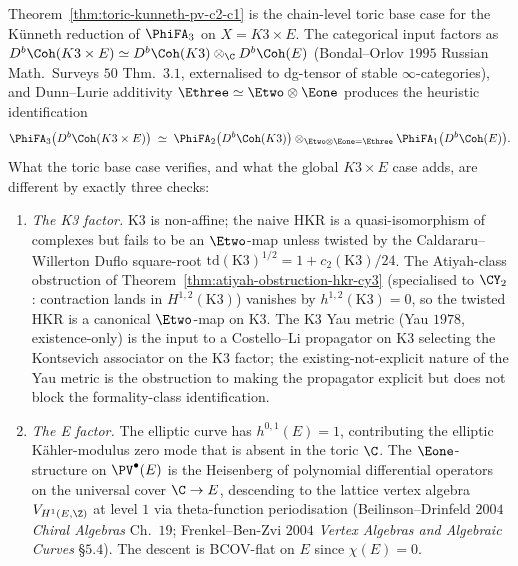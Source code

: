 \begin{remark}
\label{rem:kunneth-strategy-K3xE}
Theorem~\ref{thm:toric-kunneth-pv-c2-c1} is the chain-level toric base case for the K\"unneth reduction of $\PhiFA_3$ on $X = K3 \times E$. The categorical input factors as $D^b\Coh(K3 \times E) \simeq D^b\Coh(K3) \otimes_\C D^b\Coh(E)$ (Bondal--Orlov $1995$ Russian Math.\ Surveys $50$ Thm.~$3.1$, externalised to dg-tensor of stable $\infty$-categories), and Dunn--Lurie additivity $\Ethree \simeq \Etwo \otimes \Eone$ produces the heuristic identification
\begin{equation}
\label{eq:phifa3-K3xE-kunneth}
 \PhiFA_3\bigl(D^b\Coh(K3 \times E)\bigr) \;\simeq\; \PhiFA_2\bigl(D^b\Coh(K3)\bigr) \otimes_{\Etwo \otimes \Eone = \Ethree} \PhiFA_1\bigl(D^b\Coh(E)\bigr).
\end{equation}
What the toric base case verifies, and what the global $K3 \times E$ case adds, are different by exactly three checks:
\begin{enumerate}[label=(\roman*),leftmargin=1.5em]
 \item \emph{The K3 factor.} K3 is non-affine; the naive HKR is a quasi-isomorphism of complexes but fails to be an $\Etwo$-map unless twisted by the Caldararu--Willerton Duflo square-root $\mathrm{td}(\mathrm K3)^{1/2} = 1 + c_2(\mathrm K3)/24$. The Atiyah-class obstruction of Theorem~\ref{thm:atiyah-obstruction-hkr-cy3} (specialised to $\CY_2$: contraction lands in $H^{1,2}(\mathrm K3)$) vanishes by $h^{1,2}(\mathrm K3) = 0$, so the twisted HKR is a canonical $\Etwo$-map on K3. The K3 Yau metric (Yau $1978$, existence-only) is the input to a Costello--Li propagator on K3 selecting the Kontsevich associator on the K3 factor; the existing-not-explicit nature of the Yau metric is the obstruction to making the propagator explicit but does not block the formality-class identification.
 \item \emph{The E factor.} The elliptic curve has $h^{0,1}(E) = 1$, contributing the elliptic Kähler-modulus zero mode that is absent in the toric $\C$. The $\Eone$-structure on $\PV^\bullet(E)$ is the Heisenberg of polynomial differential operators on the universal cover $\C \to E$, descending to the lattice vertex algebra $V_{H^1(E, \Z)}$ at level $1$ via theta-function periodisation (Beilinson--Drinfeld $2004$ \emph{Chiral Algebras} Ch.~$19$; Frenkel--Ben-Zvi $2004$ \emph{Vertex Algebras and Algebraic Curves} \S$5.4$). The descent is BCOV-flat on $E$ since $\chi(E) = 0$.

\end{enumerate}
\end{remark}

